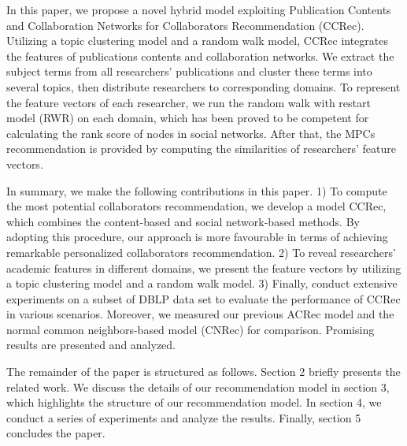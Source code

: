 \documentclass[review]{elsarticle}
\begin{document}
In this paper, we propose a novel hybrid model exploiting Publication Contents and Collaboration Networks for Collaborators Recommendation (CCRec). Utilizing a topic clustering model \cite{pan2010research} \cite{pham2011clustering} and a random walk model, CCRec integrates the features of publications contents and collaboration networks. We extract the subject terms from all researchers' publications and cluster these terms into several topics, then distribute researchers to corresponding domains. To represent the feature vectors of each researcher, we run the random walk with restart model (RWR) on each domain, which has been proved to be competent for calculating the rank score of nodes in social networks. After that, the MPCs recommendation is provided by computing the similarities of researchers' feature vectors.

In summary, we make the following contributions in this paper. 1) To compute the most potential collaborators recommendation, we develop a model CCRec, which combines the content-based and social network-based methods. By adopting this procedure, our approach is more favourable in terms of achieving remarkable personalized collaborators recommendation. 2) To reveal researchers' academic features in different domains, we present the feature vectors by utilizing a topic clustering model and a random walk model. 3) Finally, conduct extensive experiments on a subset of DBLP data set to evaluate the performance of CCRec in various scenarios. Moreover, we measured our previous ACRec model and the normal common neighbors-based model (CNRec) for comparison. Promising results are presented and analyzed.

The remainder of the paper is structured as follows. Section 2 briefly presents the related work. We discuss the details of our recommendation model in section 3, which highlights the structure of our recommendation model. In section 4, we conduct a series of experiments and analyze the results. Finally, section 5 concludes the paper.

\end{document}
